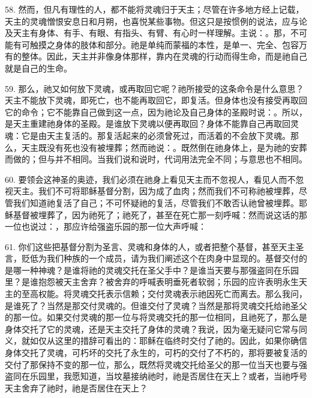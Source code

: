 58. 然而，但凡有理性的人，都不能将灵魂归于天主；尽管在许多地方经上记载，天主的灵魂憎恨安息日和月朔，也喜悦某些事物。但这只是按惯例的说法，应与论及天主有身体、有手、有眼、有指头、有臂、有心时一样理解。主说：。那，不可能有可触摸之身体的肢体和部分。祂是单纯而蒙福的本性，是单一、完全、包容万有的整体。因此，天主并非像身体那样，靠内在灵魂的行动而得生命，而是祂自己就是自己的生命。\par

59. 那么，祂又如何放下灵魂，或再取回它呢？祂所接受的这条命令是什么意思？天主不能放下灵魂，即死亡，也不能再取回它，即复活。但身体也没有接受再取回它的命令；它不能靠自己做到这一点，因为祂论及自己身体的圣殿时说：。所以，是天主重建祂身体的圣殿。是谁放下灵魂以便再取回？身体不能靠自己再取回灵魂：它是由天主复活的。那复活起来的必须曾死过，而活着的不会放下灵魂。那么，天主既没有死也没有被埋葬；然而祂说：。既然倒在祂身体上，是为祂的安葬而做的；但与并不相同。当我们说和说时，代词用法完全不同；与意思也不相同。\par

60. 要领会这神圣的奥迹，我们必须在祂身上看见天主而不忽视人，看见人而不忽视天主。我们不可将耶稣基督分割，因为成了血肉；然而我们不可称祂被埋葬，尽管我们知道祂复活了自己；不可怀疑祂的复活，尽管我们不敢否认祂曾被埋葬。耶稣基督被埋葬了，因为祂死了；祂死了，甚至在死亡那一刻呼喊：然而说这话的那一位也说过：，那应许给强盗乐园的那一位大声呼喊：\par

61. 你们这些把基督分割为圣言、灵魂和身体的人，或者把整个基督，甚至天主圣言，贬低为我们种族的一个成员，请为我们阐述这个在肉身中显现的。基督交付的是哪一种神魂？是谁将祂的灵魂交托在圣父手中？是谁当天要与那强盗同在乐园里？是谁抱怨被天主舍弃？被舍弃的呼喊表明垂死者软弱；乐园的应许表明永生天主的至高权能。将灵魂交托表示信赖；交付灵魂表示祂因死亡而离去。那么我问，是谁死了？当然是那交付灵魂的。但谁交付了灵魂？当然是那将灵魂交托给祂圣父的那一位。如果交付灵魂的那一位与将灵魂交托的那一位相同，且祂死了，那么是身体交托了它的灵魂，还是天主交托了身体的灵魂？我说，因为毫无疑问它常与同义，就如仅从这里的措辞可看出的：耶稣在临终时交付了祂的。因此，如果你确信身体交托了灵魂，可朽坏的交托了永生的，可朽的交付了不朽的，那将要被复活的交付了那保持不变的那一位，那么，既然将灵魂交托给圣父的那一位当天也要与强盗同在乐园里，我愿知道，当坟墓接纳祂时，祂是否居住在天上？或者，当祂呼号天主舍弃了祂时，祂是否居住在天上？\par

